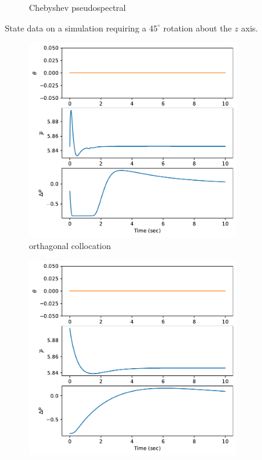 \documentclass[]{article}
\begin{document}
\begin{figure}[H]
\begin{subfigure}[b]{0.3\textwidth}
		\caption{Chebyshev pseudospectral}
	\end{subfigure}
	\caption{State data on a simulation requiring a $45^{\circ}$ rotation about the $z$ axis.}
	\label{fig:state45z}
\end{figure}

\begin{figure}[H]
	\centering
	\begin{subfigure}[b]{0.3\textwidth}
		\centering
		\includegraphics[width=\textwidth]{figures/control45dz4.pdf}
		\caption{orthagonal collocation}
	\end{subfigure}%
	\begin{subfigure}[b]{0.3\textwidth}
		\centering
		\includegraphics[width=\textwidth]{figures/control45dz6.pdf}

\end{subfigure}
\end{figure}
\end{document}
